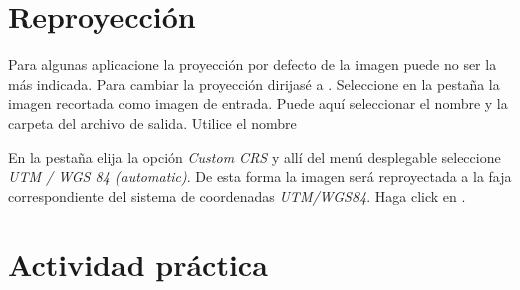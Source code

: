 \section{Reproyección}
Para algunas aplicacione la proyección por defecto de la imagen puede no ser la más indicada. Para cambiar la proyección dirijasé a . Seleccione en la pestaña  la imagen recortada como imagen de entrada. Puede aquí seleccionar el nombre y la carpeta del archivo de salida. Utilice el nombre

\begin{center}
\end{center}

En la pestaña  elija la opción \emph{Custom CRS} y allí del menú desplegable seleccione \emph{UTM / WGS 84 (automatic)}. De esta forma la imagen será reproyectada a la faja correspondiente del sistema de coordenadas \emph{UTM/WGS84}. Haga click en .

\section{Actividad práctica}

